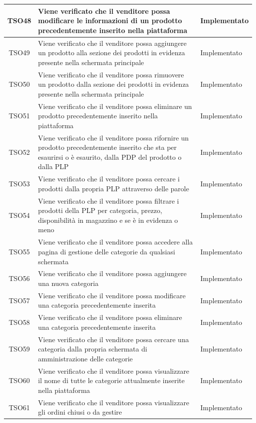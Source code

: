 \begin{longtable}{|c| C{10cm} |C{3cm}|}
    	TSO48 & Viene verificato che il venditore possa modificare le informazioni di un prodotto precedentemente inserito nella piattaforma & Implementato\\ \hline
    	TSO49 & Viene verificato che il venditore possa aggiungere un prodotto alla sezione dei prodotti in evidenza presente nella schermata principale & Implementato\\ \hline
    	TSO50 & Viene verificato che il venditore possa rimuovere un prodotto dalla sezione dei prodotti in evidenza  presente nella schermata principale & Implementato\\ \hline
    	TSO51 & Viene verificato che il venditore possa eliminare un prodotto precedentemente inserito nella piattaforma & Implementato\\ \hline
    	TSO52 & Viene verificato che il venditore possa rifornire un prodotto precedentemente inserito che sta per esaurirsi o è esaurito, dalla PDP del prodotto o dalla PLP & Implementato\\ \hline
   	TSO53 & Viene verificato che il venditore possa cercare i prodotti dalla propria PLP attraverso delle parole & Implementato\\ \hline
    	TSO54 & Viene verificato che il venditore possa filtrare i prodotti della PLP per categoria, prezzo, disponibilità in magazzino e se è in evidenza o meno & Implementato\\ \hline
	TSO55 & Viene verificato che il venditore possa accedere alla pagina di gestione delle categorie da qualsiasi schermata & Implementato\\ \hline
    	TSO56 & Viene verificato che il venditore possa aggiungere una nuova categoria & Implementato\\ \hline
    	TSO57 & Viene verificato che il venditore possa modificare una categoria precedentemente inserita & Implementato\\ \hline
   	TSO58 & Viene verificato che il venditore possa eliminare una categoria precedentemente inserita & Implementato\\ \hline
    	TSO59 & Viene verificato che il venditore possa cercare una categoria dalla propria schermata di amministrazione delle categorie & Implementato\\ \hline
	TSO60 & Viene verificato che il venditore possa visualizzare il nome di tutte le categorie attualmente inserite nella piattaforma & Implementato\\ \hline
	TSO61 & Viene verificato che il venditore possa visualizzare gli ordini chiusi o da gestire & Implementato\\ \hline

\end{longtable}
